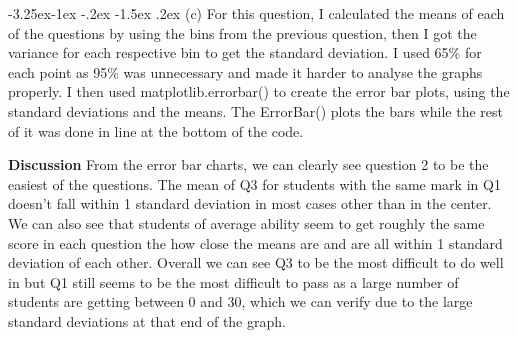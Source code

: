 \documentclass[10pt]{article} %
\makeatletter
\renewcommand\subsection{\@startsection{subsection}{2}{\z@}%
                                     {-3.25ex\@plus -1ex \@minus -.2ex}%
                                     {-1.5ex \@plus .2ex}%
                                     {\normalfont\large\bfseries}}
\makeatother
\begin{document}
\subsection{(c)} For this question, I calculated the means of each of the questions by using the bins from the previous question, then I got the variance for each respective bin to get the standard deviation. I used 65\% for each point as 95\% was unnecessary and made it harder to analyse the graphs properly. I then used matplotlib.errorbar() to create the error bar plots, using the standard deviations and the means. The ErrorBar() plots the bars while the rest of it was done in line at the bottom of the code.
\begin{figure}[h]
    \centering
    \qquad
     \qquad
    \label{fig:example}
\end{figure}
\newline
\textbf{Discussion} From the error bar charts, we can clearly see question 2 to be the easiest of the questions. The mean of Q3 for students with the same mark in Q1 doesn't fall within 1 standard deviation in most cases other than in the center. We can also see that students of average ability seem to get roughly the same score in each question the how close the means are and are all within 1 standard deviation of each other. Overall we can see Q3 to be the most difficult to do well in but Q1 still seems to be the most difficult to pass as a large number of students are getting between 0 and 30, which we can verify due to the large standard deviations at that end of the graph. 
\end{document}
